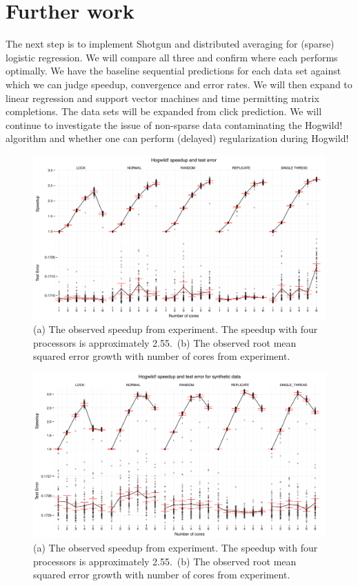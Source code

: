 \documentclass{article} %
\begin{document}
\section{Further work}
The next step is to implement Shotgun and distributed averaging for (sparse) logistic regression. We will compare all three and confirm where each performs optimally. We have the baseline sequential predictions for each data set against which we can judge speedup, convergence and error rates. We will then expand to linear regression and support vector machines and time permitting matrix completions. The data sets will be expanded from click prediction. We will continue to investigate the issue of non-sparse data contaminating the Hogwild! algorithm and whether one can perform (delayed) regularization during Hogwild!

\begin{figure}[htb]
\centering
\includegraphics[width=\textwidth]{./speedup_errors_complete.pdf}
\caption{(a) The observed speedup from experiment. The speedup with four processors is approximately 2.55.~(b) The observed root mean squared error growth with number of cores from experiment.}
\label{res}
\end{figure}

\begin{figure}[htb]
\centering
\includegraphics[width=\textwidth]{./speedup_errors_complete_syn.pdf}
\caption{(a) The observed speedup from experiment. The speedup with four processors is approximately 2.55.~(b) The observed root mean squared error growth with number of cores from experiment.}
\label{res}
\end{figure}
\end{document}
